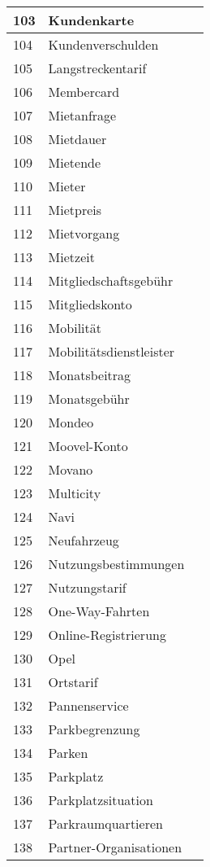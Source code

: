 \begin{longtable}{|m{1.5cm}|m{3cm}|m{8.5cm}|}
	\hline
	103 & Kundenkarte & \\
	\hline
	104 & Kundenverschulden & \\
	\hline
	105 & Langstreckentarif & \\
	\hline
	106 & Membercard & \\
	\hline
	107 & Mietanfrage & \\
	\hline
	108 & Mietdauer & \\
	\hline
	109 & Mietende & \\
	\hline
	110 & Mieter & \\
	\hline
	111 & Mietpreis & \\
	\hline
	112 & Mietvorgang & \\
	\hline
	113 & Mietzeit & \\
	\hline
	114 & Mitgliedschaftsgebühr & \\
	\hline
	115 & Mitgliedskonto & \\
	\hline
	116 & Mobilität & \\
	\hline
	117 & Mobilitätsdienstleister & \\
	\hline
	118 & Monatsbeitrag & \\
	\hline
	119 & Monatsgebühr & \\
	\hline
	120 & Mondeo & \\
	\hline
	121 & Moovel-Konto & \\
	\hline
	122 & Movano & \\
	\hline
	123 & Multicity & \\
	\hline
	124 & Navi & \\
	\hline
	125 & Neufahrzeug & \\
	\hline
	126 & Nutzungsbestimmungen & \\
	\hline
	127 & Nutzungstarif & \\
	\hline
	128 & One-Way-Fahrten & \\
	\hline
	129 & Online-Registrierung & \\
	\hline
	130 & Opel & \\
	\hline
	131 & Ortstarif & \\
	\hline
	132 & Pannenservice & \\
	\hline
	133 & Parkbegrenzung & \\
	\hline
	134 & Parken & \\
	\hline
	135 & Parkplatz & \\
	\hline
	136 & Parkplatzsituation & \\
	\hline
	137 & Parkraumquartieren & \\
	\hline
	138 & Partner-Organisationen & \\

\end{longtable}
